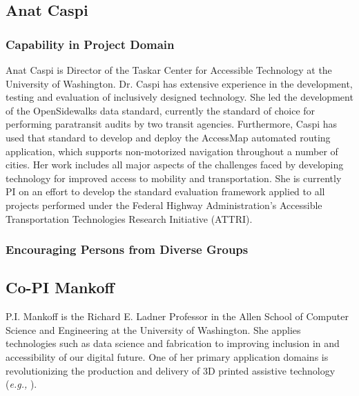 

\subsection{Anat Caspi}

\subsubsection{Capability in Project Domain}
Anat Caspi is Director of the Taskar Center for Accessible Technology at the University of Washington. Dr. Caspi has extensive experience in the development, testing and evaluation of inclusively designed technology. She led the development of the OpenSidewalks data standard, currently the standard of choice for performing paratransit audits by two transit agencies. Furthermore, Caspi has used that standard to develop and deploy the AccessMap automated routing application, which supports non-motorized navigation throughout a number of cities. Her work includes all major aspects of the challenges faced by developing technology for improved access to mobility and transportation. She is currently PI on an effort to develop the standard evaluation framework applied to all projects performed under the Federal Highway Administration's Accessible Transportation Technologies Research Initiative (ATTRI). 

 
\subsubsection{Encouraging Persons from Diverse Groups}

\subsection{Co-PI Mankoff}
P.I. Mankoff is the Richard E. Ladner Professor in the Allen School of Computer Science and Engineering 
at the University of Washington. She applies technologies such as data science and fabrication to 
improving inclusion in and accessibility of our digital future.  One of her primary application domains 
is revolutionizing the production and delivery of 3D printed assistive technology (\textit{e.g.,} \cite{Mankoff:2018:consumer,Hofmann:2016:HelpingHands,Chen:2016:Reprise}).

